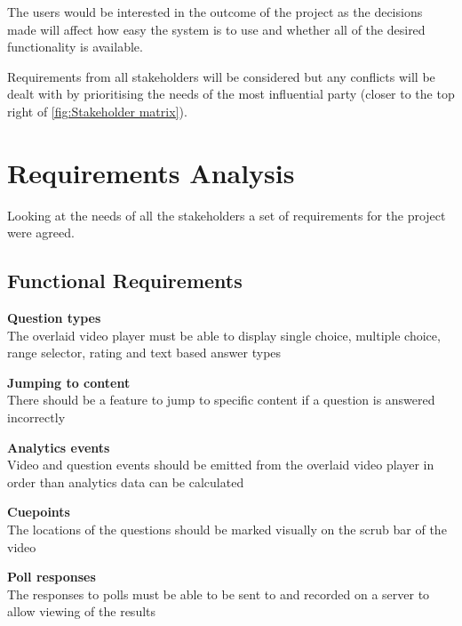 The users would be interested in the outcome of the project as the decisions made will affect how easy the system is to use and whether all of the desired functionality is available.

Requirements from all stakeholders will be considered but any conflicts will be dealt with by prioritising the needs of the most influential party (closer to the top right of \autoref{fig:Stakeholder matrix}).

\section{Requirements Analysis}
\label{Section:Requirements Analysis}
Looking at the needs of all the stakeholders a set of requirements for the project were agreed.
\subsection{Functional Requirements}
\begin{requirement}[%
 label=\textbf{F\arabic*}]
\item \textbf{Question types}  \hfill \\ The overlaid video player must be able to display single choice, multiple choice, range selector, rating and text based answer types\label{Req:Question types}
\item \textbf{Jumping to content} \hfill \\ There should be a feature to jump to specific content if a question is answered incorrectly \label{Req:Jumping to content}
\item \textbf{Analytics events} \hfill \\ Video and question events should be emitted from the overlaid video player in order than analytics data can be calculated \label{Req:Analytics events}
\item \textbf{Cuepoints} \hfill \\ The locations of the questions should be marked visually on the scrub bar of the video \label{Req:Cuepoints}
\item \textbf{Poll responses} \hfill \\ The responses to polls must be able to be sent to and recorded on a server to allow viewing of the results \label{Req:Poll responses}
\end{requirement}


